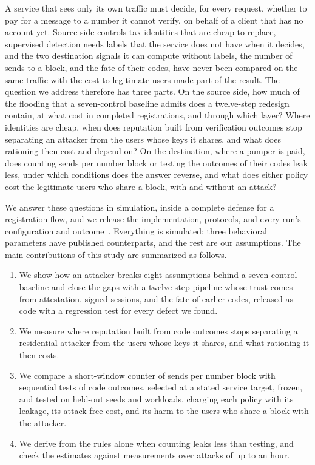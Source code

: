 \documentclass{IEEEoj}
\begin{document}
A service that sees only its own traffic must decide, for every request, whether to pay for a message to a number it cannot verify, on behalf of a client that has no account yet. Source-side controls tax identities that are cheap to replace, supervised detection needs labels that the service does not have when it decides, and the two destination signals it can compute without labels, the number of sends to a block, and the fate of their codes, have never been compared on the same traffic with the cost to legitimate users made part of the result. The question we address therefore has three parts. On the source side, how much of the flooding that a seven-control baseline admits does a twelve-step redesign contain, at what cost in completed registrations, and through which layer? Where identities are cheap, when does reputation built from verification outcomes stop separating an attacker from the users whose keys it shares, and what does rationing then cost and depend on? On the destination, where a pumper is paid, does counting sends per number block or testing the outcomes of their codes leak less, under which conditions does the answer reverse, and what does either policy cost the legitimate users who share a block, with and without an attack?

We answer these questions in simulation, inside a complete defense for a registration flow, and we release the implementation, protocols, and every run's configuration and outcome~\cite{otpguard2026}. Everything is simulated: three behavioral parameters have published counterparts, and the rest are our assumptions. The main contributions of this study are summarized as follows.
\begin{enumerate}\setlength{\itemsep}{1pt}
\item We show how an attacker breaks eight assumptions behind a seven-control baseline and close the gaps with a twelve-step pipeline whose trust comes from attestation, signed sessions, and the fate of earlier codes, released as code with a regression test for every defect we found.
\item We measure where reputation built from code outcomes stops separating a residential attacker from the users whose keys it shares, and what rationing it then costs.
\item We compare a short-window counter of sends per number block with sequential tests of code outcomes, selected at a stated service target, frozen, and tested on held-out seeds and workloads, charging each policy with its leakage, its attack-free cost, and its harm to the users who share a block with the attacker.
\item We derive from the rules alone when counting leaks less than testing, and check the estimates against measurements over attacks of up to an hour.
\end{enumerate}
\end{document}
